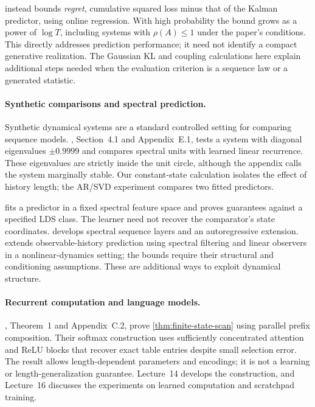 \documentclass[11pt,twoside]{article}
\theoremstyle{definition}
\theoremstyle{remark}
\begin{document}
\citet{tsiamis2020} instead bounds \emph{regret}, cumulative squared loss
minus that of the Kalman predictor, using online regression.
With high probability the bound grows as a power of \(\log T\),
including systems with \(\rho(A)\le1\) under the paper's
conditions. This directly addresses prediction performance; it need
not identify a compact generative realization. The Gaussian KL and
coupling calculations here explain additional steps needed when the
evaluation criterion is a sequence law or a generated statistic.

\paragraph{Synthetic comparisons and spectral prediction.}
Synthetic dynamical systems are a standard controlled setting for
comparing sequence models. \citet{agarwal2024}, Section~4.1 and
Appendix~E.1, tests a system with diagonal eigenvalues \(\pm0.9999\)
and compares spectral units with learned linear recurrence.
These eigenvalues are strictly inside the unit circle, although the
appendix calls the system marginally stable.
Our constant-state calculation isolates the effect of history length;
the AR/SVD experiment compares two fitted predictors.

\citet{hazan2017} fits a predictor in a fixed spectral feature space and
proves guarantees against a specified LDS class. The learner need not
recover the comparator's state coordinates. \citet{agarwal2024} develops
spectral sequence layers and an autoregressive extension.
\citet{dogariu2025} extends observable-history prediction using spectral
filtering and linear observers in a nonlinear-dynamics setting; the
bounds require their structural and conditioning assumptions.
These are additional ways to exploit dynamical structure.

\paragraph{Recurrent computation and language models.}
\citet{liu2023automata}, Theorem~1 and Appendix~C.2, prove
\cref{thm:finite-state-scan} using parallel prefix composition.
Their softmax construction uses sufficiently concentrated attention and
ReLU blocks that recover exact table entries despite small selection error.
The result allows length-dependent parameters and encodings; it is not a
learning or length-generalization guarantee. Lecture~14 develops the
construction, and Lecture~16 discusses the experiments on learned
computation and scratchpad training.
\end{document}
